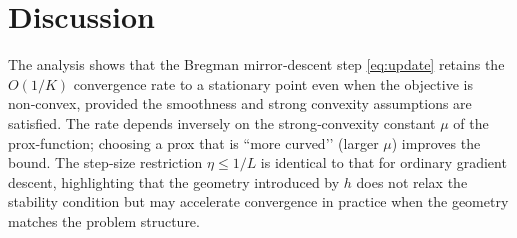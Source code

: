 \documentclass{article}
\begin{document}
\section*{Discussion}
The analysis shows that the Bregman mirror‑descent step \eqref{eq:update} retains the $O(1/K)$ convergence rate to a stationary point even when the objective is non‑convex, provided the smoothness and strong convexity assumptions are satisfied. The rate depends inversely on the strong‑convexity constant $\mu$ of the prox‑function; choosing a prox that is “more curved’’ (larger $\mu$) improves the bound. The step‑size restriction $\eta\le 1/L$ is identical to that for ordinary gradient descent, highlighting that the geometry introduced by $h$ does not relax the stability condition but may accelerate convergence in practice when the geometry matches the problem structure.
\end{document}
